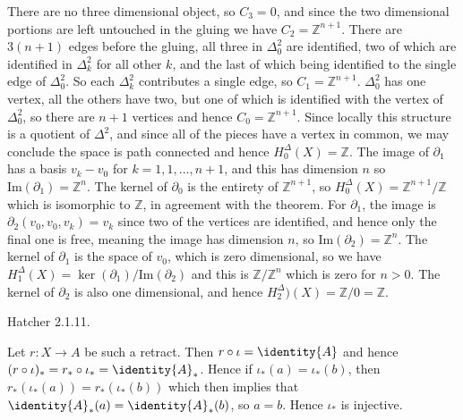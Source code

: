 \documentclass{book}                                                           %
\begin{document}
\begin{solution}
    There are no three dimensional object, so $C_{3}=0$, and since the two
    dimensional portions are left untouched in the gluing we have
    $C_{2}=\mathbb{Z}^{n+1}$. There are $3(n+1)$ edges before the gluing,
    all three in $\Delta_{0}^{2}$ are identified, two of which are
    identified in $\Delta_{k}^{2}$ for all other $k$, and the last of which
    being identified to the single edge of $\Delta_{0}^{2}$. So each
    $\Delta_{k}^{2}$ contributes a single edge, so $C_{1}=\mathbb{Z}^{n+1}$.
    $\Delta_{0}^{2}$ has one vertex, all the others have two, but one of
    which is identified with the vertex of $\Delta_{0}^{2}$, so there are
    $n+1$ vertices and hence $C_{0}=\mathbb{Z}^{n+1}$. Since locally this
    structure is a quotient of $\Delta^{2}$, and since all of the pieces
    have a vertex in common, we may conclude the space is path connected and
    hence $H_{0}^{\Delta}(X)=\mathbb{Z}$. The image of $\partial_{1}$ has a
    basis $v_{k}-v_{0}$ for $k=1,1,\dots,n+1$, and this has dimension $n$
    so $\textrm{Im}(\partial_{1})=\mathbb{Z}^{n}$. The kernel of
    $\partial_{0}$ is the entirety of $\mathbb{Z}^{n+1}$, so
    $H_{0}^{\Delta}(X)=\mathbb{Z}^{n+1}/\mathbb{Z}$ which is isomorphic to
    $\mathbb{Z}$, in agreement with the theorem. For $\partial_{1}$, the
    image is $\partial_{2}(v_{0},v_{0},v_{k})=v_{k}$ since two of the
    vertices are identified, and hence only the final one is free, meaning
    the image has dimension $n$, so
    $\textrm{Im}(\partial_{2})=\mathbb{Z}^{n}$. The kernel of
    $\partial_{1}$ is the space of $v_{0}$, which is zero dimensional, so we
    have $H_{1}^{\Delta}(X)=\ker(\partial_{1})/\textrm{Im}(\partial_{2})$
    and this is $\mathbb{Z}/\mathbb{Z}^{n}$ which is zero for $n>0$. The
    kernel of $\partial_{2}$ is also one dimensional, and hence
    $H_{2}^{\Delta})(X)=\mathbb{Z}/0=\mathbb{Z}$.
\end{solution}
\begin{problem}
    Hatcher 2.1.11.
\end{problem}
\begin{solution}
    Let $r:X\rightarrow{A}$ be such a retract. Then
    $r\circ\iota=\identity{A}$ and hence
    $(r\circ\iota)_{*}=r_{*}\circ\iota_{*}={\identity{A}}_{*}$. Hence if
    $\iota_{*}(a)=\iota_{*}(b)$, then
    $r_{*}(\iota_{*}(a))=r_{*}(\iota_{*}(b))$ which then implies that
    ${\identity{A}}_{*}(a)={\identity{A}}_{*}(b)$, so $a=b$. Hence
    $\iota_{*}$ is injective.
\end{solution}
\end{document}
